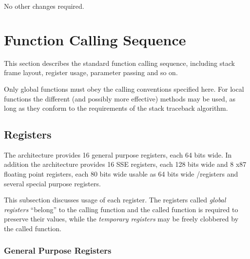 
No other changes required.

\section{Function Calling Sequence}

This section describes the standard function calling sequence,
including stack frame layout, register usage, parameter passing and so
on.

Only global functions must obey the calling conventions specified
here.  For local functions the different (and possibly more effective)
methods may be used, as long as they conform to the requirements of the
stack traceback algorithm.


\subsection{Registers}
\label{subsec-registers}

The \xARCH architecture provides 16 general purpose registers, each 64
bits wide. In addition the architecture provides 16 SSE registers,
each 128 bits wide and 8 x87 floating point registers, each 80 bits
wide usable as 64 bits wide \MMX/\threednow registers and several special
purpose registers.

This subsection discusses usage of each register.  The registers called
\emph{global registers} ``belong'' to the calling function and the called function
is required to preserve their values, while the \emph{temporary registers} may
be freely clobbered by the called function.

\subsubsection {General Purpose Registers}

